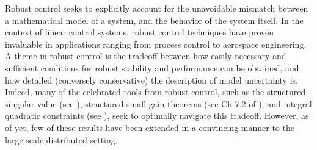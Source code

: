 Robust control seeks to explicitly account for the unavoidable mismatch between a mathematical model of a system, and the behavior of the system itself.  In the context of linear control systems, robust control techniques \cite{khammash1990stability,dahleh1994control,zhou1996robust} have proven invaluable in applications ranging from process control to aerospace engineering.  A theme in robust control is the tradeoff between how easily necessary and sufficient conditions for robust stability and performance can be obtained, and how detailed (conversely conservative) the description of model uncertainty is.  Indeed, many of the celebrated tools from robust control, such as the structured singular value (see \cite{packard1993complex}), structured small gain theorems (see Ch 7.2 of \cite{dahleh1994control}), and integral quadratic constraints (see \cite{megretski1997system}), seek to optimally navigate this tradeoff.  However, as of yet, few of these results have been extended in a convincing manner to the large-scale distributed setting.

